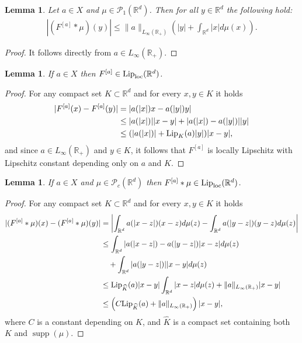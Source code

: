 \documentclass[A4paper,11pt]{article}
\newtheorem{lemma}[theorem]{Lemma}
\theoremstyle{definition}
\newcommand{\Lip}{\textup{Lip}}
\newcommand{\loc}{\textup{loc}}
\newcommand{\R}{\mathbb{R}}
\newcommand{\PP}{\mathcal{P}_1}
\DeclareMathOperator{\supp}{supp}
\newcommand{\Fun}[1]{F^{[#1]}}
\begin{document}
\begin{lemma}\label{p-estkernel}
Let $a\in X$ and $\mu \in \PP(\R^d)$. Then for all $y \in \R^d$ the following hold:
\begin{align*}
|(\Fun{a} * \mu)(y)| \leq \|a\|_{L_{\infty}(\R_+)}\left( | y | + \int_{\R^d} | x | d\mu(x) \right).
\end{align*}
\end{lemma}
\begin{proof}
It follows directly from $a \in L_{\infty}(\R_+)$.
\end{proof}

\begin{lemma}\label{p-Floclip}
If $a\in X$ then $\Fun{a} \in \Lip_\loc(\R^d)$.
\end{lemma}
\begin{proof}
For any compact set $K \subset \R^d$ and for every $x,y \in K$ it holds
\begin{align*}
|\Fun{a}(x) - \Fun{a}(y)| &= |a(|x|)x - a(|y|)y| \\
&\leq |a(|x|)| |x-y| + |a(|x|) - a(|y|)| |y| \\
&\leq (|a(|x|)| + \Lip_K(a) |y|) |x-y|,
\end{align*}
and since $a \in L_{\infty}(\R_+)$ and $y \in K$, it follows that $\Fun{a}$ is locally Lipschitz with Lipschitz constant depending only on $a$ and $K$.
\end{proof}


 
\begin{lemma}\label{p-Fmuloclip}
If $a\in X$ and $\mu \in \mathcal{P}_c(\R^d)$ then $\Fun{a}*\mu \in \Lip_{\loc}(\R^d)$.
\end{lemma}
\begin{proof}
For any compact set $K \subset \R^d$ and for every $x,y \in K$ it holds
\begin{align*}
|(\Fun{a}*\mu)(x) - (\Fun{a}*\mu)(y)| &= \left|\int_{\R^d}a(|x-z|)(x-z)d\mu(z) - \int_{\R^d}a(|y-z|)(y-z)d\mu(z)\right| \\
&\leq \int_{\R^d}|a(|x-z|)-a(|y-z|)|x-z|d\mu(z)\\
&\quad+ \int_{\R^d}|a(|y-z|)||x-y|d\mu(z) \\
&\leq \Lip_{\widehat{K}}(a)|x-y| \int_{\R^d}|x-z|d\mu(z) + \|a\|_{L_{\infty}(\R_+)}|x-y| \\
& \leq \left(C\Lip_{\widehat{K}}(a) + \|a\|_{L_{\infty}(\R_+)} \right)|x-y|,
\end{align*}
where $C$ is a constant depending on $K$, and $\widehat{K}$ is a compact set containing both $K$ and $\supp(\mu)$.
\end{proof}
\end{document}
